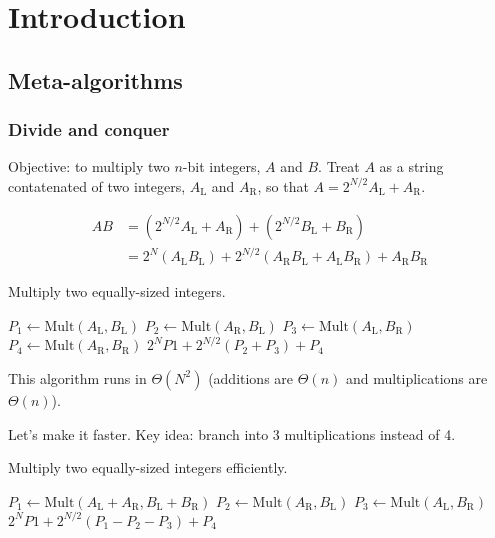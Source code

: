 \chapter{Introduction}
\section{Meta-algorithms}
\subsection{Divide and conquer}
Objective: to multiply two \(n\)-bit integers, \(A\) and \(B\).
Treat \(A\) as a string contatenated of two integers, \(A_\text{L}\) and \(A_\text{R}\),
so that \(A = 2^{N/2}A_\text{L} + A_\text{R}\).

\begin{align}
	AB &= \left(2^{N/2} A_\text{L} + A_\text{R}\right) + \left(2^{N/2} B_\text{L} + B_\text{R}\right) \\
		&= 2^N\left(A_\text{L}B_\text{L}\right) + 2^{N/2}\left(A_\text{R}B_\text{L} + A_\text{L}B_\text{R}\right) + A_\text{R}B_\text{R}
\end{align}

\begin{algorithm}
	\caption{Multiply two equally-sized integers.}
	\begin{algorithmic}
		\State \(P_1 \leftarrow \text{Mult}(A_\text{L}, B_\text{L})\)
		\State \(P_2 \leftarrow \text{Mult}(A_\text{R}, B_\text{L})\)
		\State \(P_3 \leftarrow \text{Mult}(A_\text{L}, B_\text{R})\)
		\State \(P_4 \leftarrow \text{Mult}(A_\text{R}, B_\text{R})\)
		\State\Return \(2^NP1 + 2^{N/2}\left(P_2 + P_3\right) + P_4\)
		\EndFunction
	\end{algorithmic}
\end{algorithm}

This algorithm runs in \(\Theta(N^2)\) (additions are \(\Theta(n)\) and multiplications are \(\Theta(n)\)).

Let's make it faster. Key idea: branch into 3 multiplications instead of 4.

\begin{algorithm}
	\caption{Multiply two equally-sized integers efficiently.}
	\begin{algorithmic}
		\Function{Mult}{$A,B$}
		\State \(P_1 \leftarrow \text{Mult}(A_\text{L} + A_\text{R}, B_\text{L} + B_\text{R})\)
		\State \(P_2 \leftarrow \text{Mult}(A_\text{R}, B_\text{L})\)
		\State \(P_3 \leftarrow \text{Mult}(A_\text{L}, B_\text{R})\)
		\State\Return \(2^NP1 + 2^{N/2}\left(P_1 - P_2 - P_3\right) + P_4\)
		\EndFunction
	\end{algorithmic}
\end{algorithm}